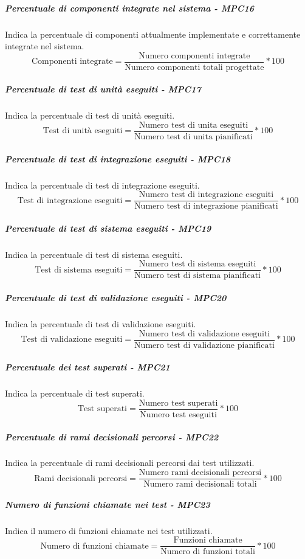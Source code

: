 \subparagraph{Percentuale di componenti integrate nel sistema - MPC16}
Indica la percentuale di componenti attualmente implementate e correttamente integrate nel sistema.
\begin{equation*}
\text{Componenti integrate} = \frac{\text{Numero componenti integrate}}{\text{Numero componenti totali progettate}} * 100
\end{equation*}
\subparagraph{Percentuale di test di unità eseguiti - MPC17}
Indica la percentuale di test di unità eseguiti.
\begin{equation*}
\text{Test di unità eseguiti} = \frac{\text{Numero test di unita eseguiti}}{\text{Numero test di unita pianificati}} * 100
\end{equation*}
\subparagraph{Percentuale di test di integrazione eseguiti - MPC18}
Indica la percentuale di test di integrazione eseguiti.
\begin{equation*}
\text{Test di integrazione eseguiti} = \frac{\text{Numero test di integrazione eseguiti}}{\text{Numero test di integrazione pianificati}} * 100
\end{equation*}
\subparagraph{Percentuale di test di sistema eseguiti - MPC19}
Indica la percentuale di test di sistema eseguiti.
\begin{equation*}
\text{Test di sistema eseguiti} = \frac{\text{Numero test di sistema eseguiti}}{\text{Numero test di sistema pianificati}} * 100
\end{equation*}
\subparagraph{Percentuale di test di validazione eseguiti - MPC20}
Indica la percentuale di test di validazione eseguiti.
\begin{equation*}
\text{Test di validazione eseguiti} = \frac{\text{Numero test di validazione eseguiti}}{\text{Numero test di validazione pianificati}} * 100
\end{equation*}
\subparagraph{Percentuale dei test superati - MPC21}
Indica la percentuale di test superati.
\begin{equation*}
\text{Test superati} = \frac{\text{Numero test superati}}{\text{Numero test eseguiti}} * 100
\end{equation*}
\subparagraph{Percentuale di rami decisionali percorsi - MPC22}
Indica la percentuale di rami decisionali percorsi dai test utilizzati.
\begin{equation*}
\text{Rami decisionali percorsi} = \frac{\text{Numero rami decisionali percorsi}}{\text{Numero rami decisionali totali}} * 100
\end{equation*}
\subparagraph{Numero di funzioni chiamate nei test - MPC23}
Indica il numero di funzioni chiamate nei test utilizzati.
\begin{equation*}
\text{Numero di funzioni chiamate} = \frac{\text{Funzioni chiamate}}{\text{Numero di funzioni totali}} * 100
\end{equation*}


